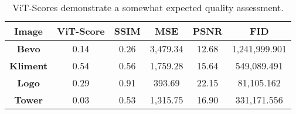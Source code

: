 \begin{table}[H]
    \begin{center}
    \begin{tabular}{|c|c|c|c|c|c|}
    \hline
    \textbf{Image}	& \textbf{ViT-Score} & \textbf{SSIM} & \textbf{MSE} & \textbf{PSNR} & \textbf{FID} \\
    \hline
    \textbf{Bevo}	 & 0.14 & 0.26 & 3,479.34 & 12.68 &  1,241,999.901\\
    \textbf{Kliment} & 0.54 & 0.56 & 1,759.28 & 15.64  &  549,089.491\\
    \textbf{Logo}	 & 0.29 & 0.91 & 393.69 & 22.15 &  81,105.162\\
    \textbf{Tower}   & 0.03 & 0.53 & 1,315.75 & 16.90 &  331,171.556\\\hline
    
    \end{tabular}
    \caption[Summary of Results]{ViT-Scores demonstrate a somewhat expected quality assessment.}
    \end{center}
    \end{table}